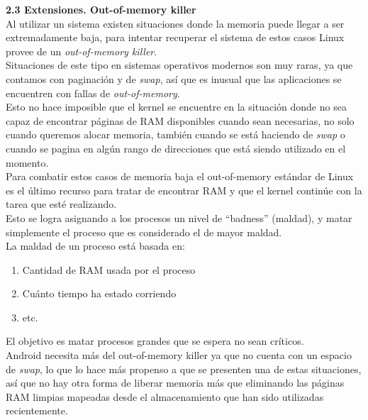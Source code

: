 \documentclass[a4paper]{article}
\begin{document}
\textbf{\Large{2.3 \; Extensiones. Out-of-memory killer}}\\[0.4em]

Al utilizar un sistema existen situaciones donde la memoria puede llegar a ser extremadamente baja, para intentar recuperar el sistema de estos casos Linux provee de un \textit{out-of-memory killer}.\\

Situaciones de este tipo en sistemas operativos modernos son muy raras, ya que contamos con paginación y de \textit{swap}, así que es inusual que las aplicaciones se encuentren con fallas de \textit{out-of-memory}.\\

Esto no hace imposible que el kernel se encuentre en la situación donde no sea capaz de encontrar páginas de RAM disponibles cuando sean necesarias, no solo cuando queremos alocar memoria, también cuando se está haciendo de \textit{swap} o cuando se pagina en algún rango de direcciones que está siendo utilizado en el momento.\\

Para combatir estos casos de memoria baja el out-of-memory estándar de Linux es el último recurso para tratar de encontrar RAM y que el kernel continúe con la tarea que esté realizando.\\

Esto se logra asignando a los procesos un nivel de “badness” (maldad), y matar simplemente el proceso que es considerado el de mayor maldad.\\

La maldad de un proceso está basada en:

\begin{enumerate}
    \item Cantidad de RAM usada por el proceso
    \item Cuánto tiempo ha estado corriendo
    \item etc.
\end{enumerate}
El objetivo es matar procesos grandes que se espera no sean críticos.\\

Android necesita más del out-of-memory killer ya que no cuenta con un espacio de \textit{swap}, lo que lo hace más propenso a que se presenten una de estas situaciones, así que no hay otra forma de liberar memoria más que eliminando las páginas RAM limpias mapeadas desde el almacenamiento que han sido utilizadas recientemente.\\
\end{document}
